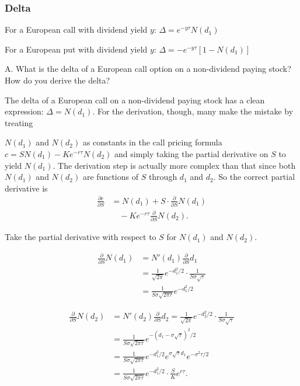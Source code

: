 \subsubsection*{Delta}

For a European call with dividend yield $y$: $\Delta=e^{-y\tau}N(d_1)$

For a European put with dividend yield $y$: $\Delta=-e^{-y\tau}[1-N(d_1)]$

\begin{problem}{A. What is the delta of a European call option on a non-dividend paying stock? How do you derive the delta?}
\end{problem}

\begin{solution}
The delta of a European call on a non-dividend paying stock has a clean expression:
$\Delta=N(d_1)$. For the derivation, though, many make the mistake by treating


$N(d_1)$ and $N(d_2)$ as constants in the call pricing formula
$c=SN(d_1)-Ke^{-r\tau}N(d_2)$ and simply taking the partial derivative on $S$ to yield
$N(d_1)$. The derivation step is actually more complex than that since both $N(d_1)$ and
$N(d_2)$ are functions of $S$ through $d_1$ and $d_2$. So the correct partial derivative is
\[
\begin{aligned}
\frac{\partial c}{\partial S}&=N(d_1)+S\cdot\frac{\partial}{\partial S}N(d_1)\\
&\quad-Ke^{-r\tau}\frac{\partial}{\partial S}N(d_2).
\end{aligned}
\]

Take the partial derivative with respect to $S$ for $N(d_1)$ and $N(d_2)$.\footnotemark[9]

\[
\begin{aligned}
\frac{\partial}{\partial S}N(d_1)&=N'(d_1)\frac{\partial}{\partial S}d_1\\
&=\frac{1}{\sqrt{2\pi}}e^{-d_1^2/2}\cdot\frac{1}{S\sigma\sqrt{\tau}}\\
&=\frac{1}{S\sigma\sqrt{2\pi\tau}}e^{-d_1^2/2}
\end{aligned}
\]

\[
\begin{aligned}
\frac{\partial}{\partial S}N(d_2)
&=N'(d_2)\frac{\partial}{\partial S}d_2
=\frac{1}{\sqrt{2\pi}}e^{-d_2^2/2}\cdot\frac{1}{S\sigma\sqrt{\tau}}\\
&=\frac{1}{S\sigma\sqrt{2\pi\tau}}e^{-(d_1-\sigma\sqrt{\tau})^2/2}\\
&=\frac{1}{S\sigma\sqrt{2\pi\tau}}e^{-d_1^2/2}e^{\sigma\sqrt{\tau}d_1}e^{-\sigma^2\tau/2}\\
&=\frac{1}{S\sigma\sqrt{2\pi\tau}}e^{-d_1^2/2}\cdot\frac{S}{K}e^{r\tau}.
\end{aligned}
\]


\end{solution}
